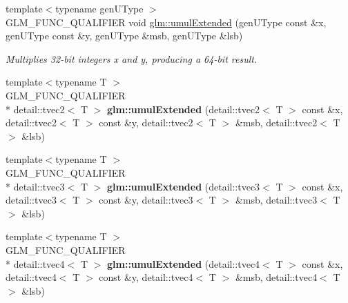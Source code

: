 \begin{DoxyCompactItemize}
\item 
{\footnotesize template$<$typename gen\-U\-Type $>$ }\\G\-L\-M\-\_\-\-F\-U\-N\-C\-\_\-\-Q\-U\-A\-L\-I\-F\-I\-E\-R void \hyperlink{group__core__func__integer_ga8e89fcd6b0e2cd96cd2e1b69fdb7afd9}{glm\-::umul\-Extended} (gen\-U\-Type const \&x, gen\-U\-Type const \&y, gen\-U\-Type \&msb, gen\-U\-Type \&lsb)
\begin{DoxyCompactList}\small\item\em Multiplies 32-\/bit integers x and y, producing a 64-\/bit result. \end{DoxyCompactList}\item 
\hypertarget{namespaceglm_afd73bd0bfe3b486ad3609a4f3b335a92}{{\footnotesize template$<$typename T $>$ }\\G\-L\-M\-\_\-\-F\-U\-N\-C\-\_\-\-Q\-U\-A\-L\-I\-F\-I\-E\-R \\*
detail\-::tvec2$<$ T $>$ {\bfseries glm\-::umul\-Extended} (detail\-::tvec2$<$ T $>$ const \&x, detail\-::tvec2$<$ T $>$ const \&y, detail\-::tvec2$<$ T $>$ \&msb, detail\-::tvec2$<$ T $>$ \&lsb)}\label{namespaceglm_afd73bd0bfe3b486ad3609a4f3b335a92}

\item 
\hypertarget{namespaceglm_a0b3d52bde31bea183a58c5474e894d82}{{\footnotesize template$<$typename T $>$ }\\G\-L\-M\-\_\-\-F\-U\-N\-C\-\_\-\-Q\-U\-A\-L\-I\-F\-I\-E\-R \\*
detail\-::tvec3$<$ T $>$ {\bfseries glm\-::umul\-Extended} (detail\-::tvec3$<$ T $>$ const \&x, detail\-::tvec3$<$ T $>$ const \&y, detail\-::tvec3$<$ T $>$ \&msb, detail\-::tvec3$<$ T $>$ \&lsb)}\label{namespaceglm_a0b3d52bde31bea183a58c5474e894d82}

\item 
\hypertarget{namespaceglm_a0516c3b14eb0df2ce7002e04de45f0a1}{{\footnotesize template$<$typename T $>$ }\\G\-L\-M\-\_\-\-F\-U\-N\-C\-\_\-\-Q\-U\-A\-L\-I\-F\-I\-E\-R \\*
detail\-::tvec4$<$ T $>$ {\bfseries glm\-::umul\-Extended} (detail\-::tvec4$<$ T $>$ const \&x, detail\-::tvec4$<$ T $>$ const \&y, detail\-::tvec4$<$ T $>$ \&msb, detail\-::tvec4$<$ T $>$ \&lsb)}\label{namespaceglm_a0516c3b14eb0df2ce7002e04de45f0a1}


\end{DoxyCompactItemize}
